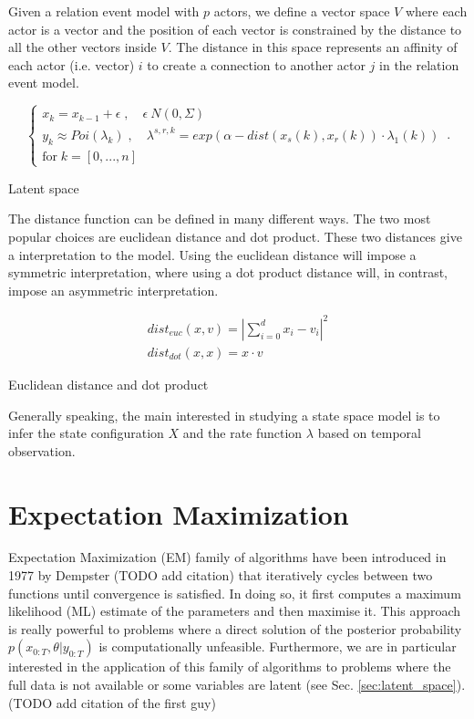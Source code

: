 \documentclass[mscthesis]{usiinfthesis}
\begin{document}
Given a relation event model with $p$ actors, we define a vector space $V$ where each actor is a vector and the position of each vector is constrained by the distance to all the other vectors inside $V$. The distance in this space represents an affinity of each actor (i.e. vector) $i$ to create a connection to another actor $j$ in the relation event model.


\begin{eqfloat}
\begin{equation}
    \begin{cases}
      x_k = x_{k-1} + \epsilon \; , \quad \epsilon ~ N(0, \Sigma) \\
      y_k \approx Poi(\lambda_k) \; , \quad \lambda^{s, r, k} = exp\left(\alpha-dist(x_s(k), x_r(k)) \cdot \lambda_1(k) \right) \\
      \textrm{for} \; k = [0, ..., n]
    \end{cases}\,.
\label{eq:latentspace}
\end{equation}
\caption{Latent space}
\end{eqfloat}

The distance function can be defined in many different ways. The two most popular choices are euclidean distance and dot product. These two distances give a interpretation to the model. Using the euclidean distance will impose a symmetric interpretation, where using a dot product distance will, in contrast, impose an asymmetric interpretation.

\begin{eqfloat}
\begin{equation}
\begin{array}{l}
dist_{euc}(x, v) = |\sum_{i=0}^d x_i - v_i|^2 \\
dist_{dot}(x, x) = x \cdot v
\end{array}
\label{eq:distance_latentspace}
\end{equation}
\caption{Euclidean distance and dot product}
\end{eqfloat}

Generally speaking, the main interested in studying a state space model is to infer the state configuration $X$ and the rate function $\lambda$ based on temporal observation.

\section{Expectation Maximization}

Expectation Maximization (EM) family of algorithms have been introduced in 1977 by Dempster (TODO add citation) that iteratively cycles between two functions until convergence is satisfied. In doing so, it first computes a maximum likelihood (ML) estimate of the parameters and then maximise it. This approach is really powerful to problems where a direct solution of the posterior probability $p(x_{0:T}, \theta | y_{0:T})$ is computationally unfeasible. Furthermore, we are in particular interested in the application of this family of algorithms to problems where the full data is not available or some variables are latent (see Sec. \ref{sec:latent_space}). (TODO add citation of the first guy) \\
\end{document}
